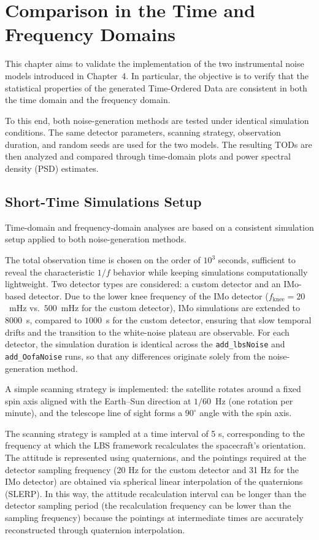 \chapter{Comparison in the Time and Frequency Domains}

This chapter aims to validate the implementation of the two instrumental noise models introduced in Chapter~4. In particular, the objective is to verify that the statistical properties of the generated Time-Ordered Data are consistent in both the time domain and the frequency domain.

To this end, both noise-generation methods are tested under identical simulation conditions. The same detector parameters, scanning strategy, observation duration, and random seeds are used for the two models. The resulting TODs are then analyzed and compared through time-domain plots and power spectral density (PSD) estimates.



\section{Short-Time Simulations Setup}

Time-domain and frequency-domain analyses are based on a consistent simulation setup applied to both noise-generation methods.

The total observation time is chosen on the order of $10^3$ seconds, sufficient to reveal the characteristic $1/f$ behavior while keeping simulations computationally lightweight. Two detector types are considered: a custom detector and an IMo-based detector. Due to the lower knee frequency of the IMo detector ($f_\text{knee} = 20$~mHz vs.\ $500$~mHz for the custom detector), IMo simulations are extended to $8000$~s, compared to $1000$~s for the custom detector, ensuring that slow temporal drifts and the transition to the white-noise plateau are observable. For each detector, the simulation duration is identical across the \texttt{add\_lbsNoise} and \texttt{add\_OofaNoise} runs, so that any differences originate solely from the noise-generation method.

A simple scanning strategy is implemented: the satellite rotates around a fixed spin axis aligned with the Earth--Sun direction at $1/60$~Hz (one rotation per minute), and the telescope line of sight forms a $90^\circ$ angle with the spin axis. 

The scanning strategy is sampled at a time interval of 5 s, corresponding to the frequency at which the LBS framework recalculates the spacecraft's orientation. The attitude is represented using quaternions, and the pointings required at the detector sampling frequency (20 Hz for the custom detector and 31 Hz for the IMo detector) are obtained via spherical linear interpolation of the quaternions (SLERP). In this way, the attitude recalculation interval can be longer than the detector sampling period (the recalculation frequency can be lower than the sampling frequency) because the pointings at intermediate times are accurately reconstructed through quaternion interpolation.



